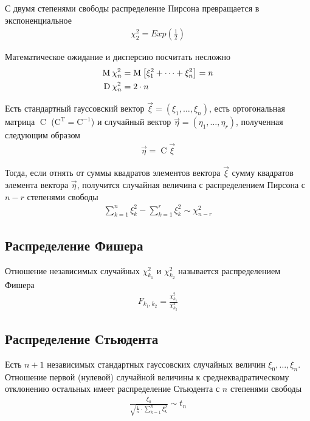 С двумя степенями свободы распределение Пирсона превращается в экспоненциальное
\begin{align*}
    \chi_2^2 = Exp\left( \frac{1}{2} \right)
\end{align*}

Математическое ожидание и дисперсию посчитать несложно
\begin{align*}
    \operatorname{M}_{} \chi_n^2 &= \operatorname{M}_{} \left[ \xi_1^2 + \dots + \xi_n^2 \right] = n \\
    \operatorname{D}_{} \chi_n^2 &= 2 \cdot n
\end{align*}

\begin{lemma}[Фишера]
    Есть стандартный гауссовский вектор
    $\vec{\xi} = \left( \xi_1, \dots, \xi_n \right)$, есть ортогональная матрица
    $\operatorname{C}$ ($\operatorname{C^T} = \operatorname{C^{-1}}$) и
    случайный вектор $\vec{\eta} = \left( \eta_1, \dots, \eta_r \right)$,
    полученная следующим образом
    \begin{align*}
        \vec{\eta} = \operatorname{C} \vec{\xi}
    \end{align*}

    Тогда, если отнять от суммы квадратов элементов вектора $\vec{\xi}$ сумму
    квадратов элемента вектора $\vec{\eta}$, получится случайная величина
    с распределением Пирсона с $n-r$ степенями свободы
    \begin{align*}
        \sum_{k=1}^{n} \xi_k^2 - \sum_{k=1}^{r} \xi_k^2 \sim \chi_{n-r}^2
    \end{align*}
\end{lemma}

\subsection{Распределение Фишера}
\begin{definition}
    Отношение независимых случайных $\chi_{k_1}^2$ и $\chi_{k_2}^2$ называется
    распределением Фишера
    \begin{align*}
        F_{k_1, k_2} = \frac{\chi_{k_1}^2}{\chi_{k_2}^2}
    \end{align*}
\end{definition}

\subsection{Распределение Стьюдента}
\begin{definition}
    Есть $n+1$ независимых стандартных гауссовских случайных величин
    $\xi_0, \dots, \xi_n$. Отношение первой (нулевой) случайной величины к
    среднеквадратическому отклонению остальных имеет распределение Стьюдента
    с $n$ степенями свободы
    \begin{align*}
        \frac{\xi_0}{\sqrt{\frac{1}{n} \cdot \sum_{k=1}^{n}\xi_k^2}} \sim t_n
    \end{align*}
\end{definition}

